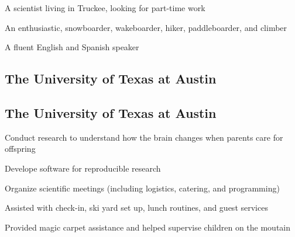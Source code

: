 \documentclass[]{deedy-resume-openfont}
\begin{document}
\begin{minipage}[t]{0.79\textwidth} 


\vspace{0.16 cm}

A scientist living in Truckee, looking for part-time work 

An enthusiastic, snowboarder, wakeboarder, hiker, paddleboarder, and climber

A fluent English and Spanish speaker 

\sectionsep
\sectionsep 



\subsection{The University of Texas at Austin}

\sectionsep

\subsection{The University of Texas at Austin}

\sectionsep
\sectionsep 


\begin{tightemize}
\item Conduct research to understand how the brain changes when parents care for offspring
\item Develope software for reproducible research
\item Organize scientific meetings (including logistics, catering, and programming) 
\end{tightemize}
\sectionsep


\begin{tightemize}
\item Assisted with check-in, ski yard set up, lunch routines, and guest services
\item Provided magic carpet assistance and helped supervise children on the moutain
\end{tightemize}
\sectionsep




\end{minipage}
\end{document}
